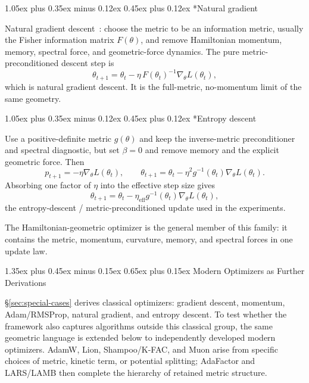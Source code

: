 \documentclass[10pt,twocolumn]{article}
\makeatletter
\renewcommand\section{\@startsection{section}{1}{0pt}%
  {1.35ex plus 0.45ex minus 0.15ex}%
  {0.65ex plus 0.15ex}%
  {\large\bfseries}}
\renewcommand\subsection{\@startsection{subsection}{2}{0pt}%
  {1.05ex plus 0.35ex minus 0.12ex}%
  {0.45ex plus 0.12ex}%
  {\normalsize\bfseries}}
\makeatother
\begin{document}
\subsection*{Natural gradient}

Natural gradient descent~\cite{amari1998natural}: choose the metric to be an
information metric, usually the Fisher information
matrix $F(\theta)$, and remove Hamiltonian momentum, memory, spectral force,
and geometric-force dynamics. The pure metric-preconditioned descent step is
\begin{equation}
\theta_{t+1}
  =\theta_t-\eta\,F(\theta_t)^{-1}\nabla_\theta L(\theta_t),
\end{equation}
which is natural gradient descent. It is the full-metric, no-momentum limit of
the same geometry.

\subsection*{Entropy descent}

Use a positive-definite metric $g(\theta)$ and keep the inverse-metric
preconditioner and spectral diagnostic, but set $\beta=0$ and remove memory and
the explicit geometric force. Then
\begin{equation}
p_{t+1}=-\eta\nabla_\theta L(\theta_t),
\qquad
\theta_{t+1}=\theta_t-\eta^2 g^{-1}(\theta_t)\nabla_\theta L(\theta_t).
\end{equation}
Absorbing one factor of $\eta$ into the effective step size gives
\begin{equation}
\theta_{t+1}
  =\theta_t-\eta_{\mathrm{eff}}g^{-1}(\theta_t)\nabla_\theta L(\theta_t),
\end{equation}
the entropy-descent / metric-preconditioned update used in the experiments.

The Hamiltonian-geometric optimizer is the general member of this family:
it contains the metric, momentum, curvature, memory, and spectral forces in
one update law.

\section{Modern Optimizers as Further Derivations}
\label{sec:modern-optimizers}

\S\ref{sec:special-cases} derives classical optimizers: gradient descent,
momentum, Adam/RMSProp, natural gradient, and entropy descent. To test whether
the framework also captures algorithms outside this classical group, the same
geometric language is extended below to independently developed modern
optimizers. AdamW, Lion, Shampoo/K-FAC, and Muon arise from specific choices
of metric, kinetic term, or potential splitting; AdaFactor and LARS/LAMB then
complete the hierarchy of retained metric structure.
\end{document}
